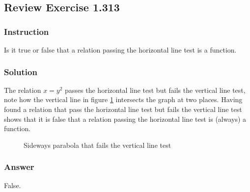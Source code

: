 \subsection*{Review Exercise 1.313}

\subsubsection*{Instruction}

Is it true or false that a relation passing the horizontal line test is a function.

\subsubsection*{Solution}

The relation \( x = y^2 \) passes the horizontal line test but fails the vertical line test, note how the vertical line in figure \ref{fig:review-exercise-313-sideways-parabola} intersects the graph at two places. Having found a relation that pass the horizontal line test but fails the vertical line test shows that it is false that a relation passing the horizontal line test is (always) a function.

\begin{figure}[H]
  \centering
  \caption{Sideways parabola that fails the vertical line test}
  \label{fig:review-exercise-313-sideways-parabola}
\end{figure}

\subsubsection*{Answer}

False.
